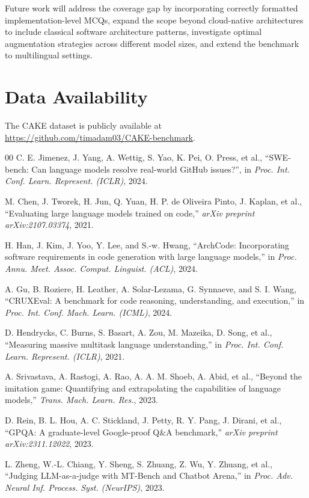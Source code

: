 \documentclass[conference]{IEEEtran}
\begin{document}
Future work will address the coverage gap by incorporating correctly formatted implementation-level MCQs, expand the scope beyond cloud-native architectures to include classical software architecture patterns, investigate optimal augmentation strategies across different model sizes, and extend the benchmark to multilingual settings.

\section*{Data Availability}
The CAKE dataset is publicly available at \\\url{https://github.com/timadam03/CAKE-benchmark}.

\balance
\begin{thebibliography}{00}
 C. E. Jimenez, J. Yang, A. Wettig, S. Yao, K. Pei, O. Press, et al., ``SWE-bench: Can language models resolve real-world GitHub issues?'', in \textit{Proc. Int. Conf. Learn. Represent. (ICLR)}, 2024.

 M. Chen, J. Tworek, H. Jun, Q. Yuan, H. P. de Oliveira Pinto, J. Kaplan, et al., ``Evaluating large language models trained on code,'' \textit{arXiv preprint arXiv:2107.03374}, 2021.

 H. Han, J. Kim, J. Yoo, Y. Lee, and S.-w. Hwang, ``ArchCode: Incorporating software requirements in code generation with large language models,'' in \textit{Proc. Annu. Meet. Assoc. Comput. Linguist. (ACL)}, 2024.

 A. Gu, B. Roziere, H. Leather, A. Solar-Lezama, G. Synnaeve, and S. I. Wang, ``CRUXEval: A benchmark for code reasoning, understanding, and execution,'' in \textit{Proc. Int. Conf. Mach. Learn. (ICML)}, 2024.

 D. Hendrycks, C. Burns, S. Basart, A. Zou, M. Mazeika, D. Song, et al., ``Measuring massive multitask language understanding,'' in \textit{Proc. Int. Conf. Learn. Represent. (ICLR)}, 2021.

 A. Srivastava, A. Rastogi, A. Rao, A. A. M. Shoeb, A. Abid, et al., ``Beyond the imitation game: Quantifying and extrapolating the capabilities of language models,'' \textit{Trans. Mach. Learn. Res.}, 2023.

 D. Rein, B. L. Hou, A. C. Stickland, J. Petty, R. Y. Pang, J. Dirani, et al., ``GPQA: A graduate-level Google-proof Q\&A benchmark,'' \textit{arXiv preprint arXiv:2311.12022}, 2023.


 L. Zheng, W.-L. Chiang, Y. Sheng, S. Zhuang, Z. Wu, Y. Zhuang, et al., ``Judging LLM-as-a-judge with MT-Bench and Chatbot Arena,'' in \textit{Proc. Adv. Neural Inf. Process. Syst. (NeurIPS)}, 2023.


\end{thebibliography}
\end{document}
